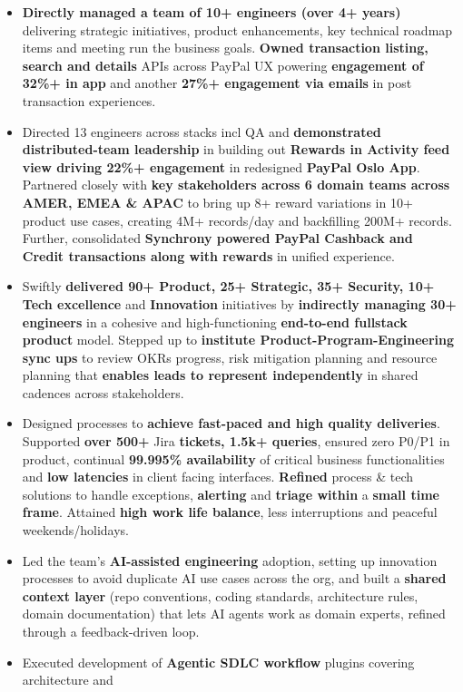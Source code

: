 \documentclass[10pt,letterpaper]{article}
\newcommand{\bd}[1]{\textbf{#1}}
\begin{document}
\begin{itemize}
\item \bd{Directly managed a team of 10+ engineers (over 4+ years)} delivering strategic initiatives,
  product enhancements, key technical roadmap items and meeting run the business goals.
  \bd{Owned transaction listing, search and details} APIs across PayPal UX powering
  \bd{engagement of 32\%+ in app} and another \bd{27\%+ engagement via emails} in post
  transaction experiences.
\item Directed 13 engineers across stacks incl QA and \bd{demonstrated distributed-team leadership} 
in building out \bd{Rewards in Activity feed view driving 22\%+ engagement} in redesigned \bd{PayPal Oslo App}.
Partnered closely with \bd{key stakeholders across 6 domain teams across AMER, EMEA \& APAC} to 
bring up 8+ reward variations in 10+ product use cases, creating 4M+ records/day and backfilling 200M+ records. 
Further, consolidated \bd{Synchrony powered PayPal Cashback and Credit transactions along with rewards} in unified experience.
\item Swiftly \bd{delivered 90+ Product, 25+ Strategic, 35+ Security, 10+ Tech excellence}
  and \bd{Innovation} initiatives by \bd{indirectly managing 30+ engineers} in a cohesive and
  high-functioning \bd{end-to-end fullstack product} model. Stepped up to \bd{institute
  Product-Program-Engineering sync ups} to review OKRs progress, risk mitigation planning
  and resource planning that \bd{enables leads to represent independently} in shared
  cadences across stakeholders.
\item Designed processes to \bd{achieve fast-paced and high quality deliveries}. Supported
  \bd{over 500+} Jira \bd{tickets, 1.5k+ queries}, ensured zero P0/P1 in product, continual
  \bd{99.995\% availability} of critical business functionalities and \bd{low latencies} in
  client facing interfaces. \bd{Refined} process \& tech solutions to handle exceptions,
  \bd{alerting} and \bd{triage within} a \bd{small time frame}. Attained \bd{high work life
  balance}, less interruptions and peaceful weekends/holidays.
\item Led the team's \bd{AI-assisted engineering} adoption, setting up innovation processes
  to avoid duplicate AI use cases across the org, and built a \bd{shared context
  layer} (repo conventions, coding standards, architecture rules, domain documentation) that lets
  AI agents work as domain experts, refined through a feedback-driven loop.
\item Executed development of \bd{Agentic SDLC workflow} plugins covering architecture and

\end{itemize}
\end{document}
